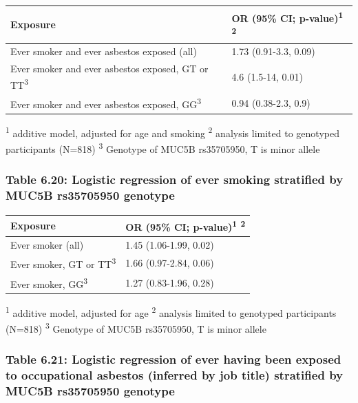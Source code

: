 \begin{longtable}[]{@{}ll@{}}
\toprule
Exposure & OR (95\% CI; p-value)\textsuperscript{1}
\textsuperscript{2}\tabularnewline
\midrule
\endhead
Ever smoker and ever asbestos exposed (all) & 1.73 (0.91-3.3,
0.09)\tabularnewline
Ever smoker and ever asbestos exposed, GT or TT\textsuperscript{3} & 4.6
(1.5-14, 0.01)\tabularnewline
Ever smoker and ever asbestos exposed, GG\textsuperscript{3} & 0.94
(0.38-2.3, 0.9)\tabularnewline
\bottomrule
\end{longtable}

\textsuperscript{1} additive model, adjusted for age and smoking
\textsuperscript{2} analysis limited to genotyped participants (N=818)
\textsuperscript{3} Genotype of MUC5B rs35705950, T is minor allele

\hypertarget{table-6.20-logistic-regression-of-ever-smoking-stratified-by-muc5b-rs35705950-genotype}{%
\subsubsection{Table 6.20: Logistic regression of ever smoking
stratified by MUC5B rs35705950
genotype}\label{table-6.20-logistic-regression-of-ever-smoking-stratified-by-muc5b-rs35705950-genotype}}

\begin{longtable}[]{@{}ll@{}}
\toprule
Exposure & OR (95\% CI; p-value)\textsuperscript{1}
\textsuperscript{2}\tabularnewline
\midrule
\endhead
Ever smoker (all) & 1.45 (1.06-1.99, 0.02)\tabularnewline
Ever smoker, GT or TT\textsuperscript{3} & 1.66 (0.97-2.84,
0.06)\tabularnewline
Ever smoker, GG\textsuperscript{3} & 1.27 (0.83-1.96,
0.28)\tabularnewline
\bottomrule
\end{longtable}

\textsuperscript{1} additive model, adjusted for age \textsuperscript{2}
analysis limited to genotyped participants (N=818) \textsuperscript{3}
Genotype of MUC5B rs35705950, T is minor allele

\newpage

\hypertarget{table-6.21-logistic-regression-of-ever-having-been-exposed-to-occupational-asbestos-inferred-by-job-title-stratified-by-muc5b-rs35705950-genotype}{%
\subsubsection{Table 6.21: Logistic regression of ever having been
exposed to occupational asbestos (inferred by job title) stratified by
MUC5B rs35705950
genotype}\label{table-6.21-logistic-regression-of-ever-having-been-exposed-to-occupational-asbestos-inferred-by-job-title-stratified-by-muc5b-rs35705950-genotype}}

